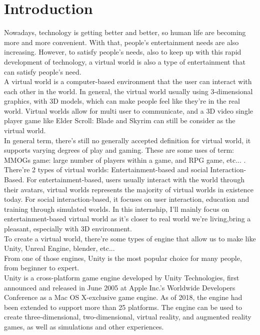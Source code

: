 \documentclass[a4paper, 13pt]{extarticle}
\begin{document}
\newpage
\section{\Large Introduction} 
Nowadays, technology is getting better and better, so human life are becoming more and more convenient. With that, people's entertainment needs are also increasing. However, to satisfy people's needs, also to keep up with this rapid development of technology, a virtual world is also a type of entertainment that can satisfy people's need. \\[0.35cm]  A virtual world is a computer-based environment that the user can interact with each other in the world. In general, the virtual world usually using 3-dimensional graphics, with 3D models, which can make people feel like they're in the real world. Virtual worlds allow for multi user to communicate, and a 3D video single player game like Elder Scroll: Blade and Skyrim can still be consider as the virtual world. \\[0.35cm] In general term, there's still no generally accepted definition for virtual world, it supports varying degrees of play and gaming. These are some uses of term: MMOGs game: large number of players within a game, and RPG game, etc... . There're 2 types of virtual worlds: Entertainment-based and social Interaction-Based. For entertainment-based, users usually interact with the world through their avatars, virtual worlds represents the majority of virtual worlds in existence today. For social interaction-based, it focuses on user interaction, education and training through simulated worlds. In this internship, I'll mainly focus on entertainment-based virtual world as it's closer to real world we're living,bring a pleasant, especially with 3D environment. \\[0.35cm] To create a virtual world, there're some types of engine that allow us to make like Unity, Unreal Engine, blender, etc... \\[0.35cm] From one of those engines, Unity is the most popular choice for many people, from beginner to expert. \\[0.35cm] Unity is a cross-platform game engine developed by Unity Technologies, first announced and released in June 2005 at Apple Inc.'s Worldwide Developers Conference as a Mac OS X-exclusive game engine. As of 2018, the engine had been extended to support more than 25 platforms. The engine can be used to create three-dimensional, two-dimensional, virtual reality, and augmented reality games, as well as simulations and other experiences. \\[0.35cm]
\end{document}
